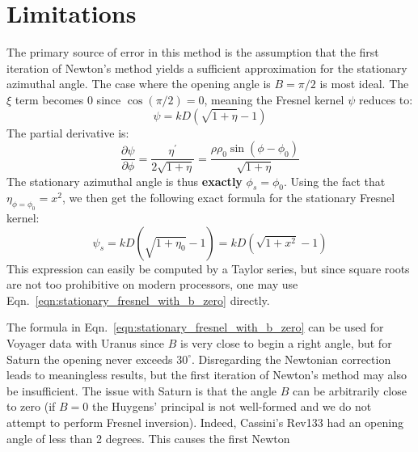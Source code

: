 \documentclass{article}
\theoremstyle{plain}
\begin{document}
    \section{Limitations}
        The primary source of error in this method is the assumption that
        the first iteration of Newton's method yields a sufficient
        approximation for the stationary azimuthal angle. The case where the
        opening angle is $B=\pi/2$ is most ideal.
        The $\xi$ term becomes $0$ since $\cos(\pi/2)=0$, meaning the
        Fresnel kernel $\psi$ reduces to:
        \begin{equation}
            \psi=kD\left(
                \sqrt{1+\eta}-1
            \right)
        \end{equation}
        The partial derivative is:
        \begin{equation}
            \frac{\partial\psi}{\partial\phi}
            =\frac{\eta^{\prime}}{2\sqrt{1+\eta}}
            =\frac{\rho\rho_{0}\sin(\phi-\phi_{0})}{\sqrt{1+\eta}}
        \end{equation}
        The stationary azimuthal angle is thus \textbf{exactly}
        $\phi_{s}=\phi_{0}$. Using the fact that $\eta_{\phi=\phi_{0}}=x^{2}$,
        we then get the following exact formula for the stationary Fresnel
        kernel:
        \begin{equation}
            \label{eqn:stationary_fresnel_with_b_zero}
            \psi_{s}
            =kD\left(
                \sqrt{1+\eta_{0}}-1
            \right)
            =kD(\sqrt{1+x^{2}}-1)
        \end{equation}
        This expression can easily be computed by a Taylor series, but since
        square roots are not too prohibitive on modern processors, one may
        use Eqn.~\ref{eqn:stationary_fresnel_with_b_zero} directly.
        \par\hfill\par
        The formula in Eqn.~\ref{eqn:stationary_fresnel_with_b_zero} can be
        used for Voyager data with Uranus since $B$ is very close to begin a
        right angle, but for Saturn the opening never exceeds $30^{\circ}$.
        Disregarding the Newtonian correction leads to meaningless results, but
        the first iteration of Newton's method may also be insufficient. The
        issue with Saturn is that the angle $B$ can be arbitrarily close to
        zero (if $B=0$ the Huygens' principal is not well-formed and we do not
        attempt to perform Fresnel inversion). Indeed, Cassini's Rev133 had an
        opening angle of less than 2 degrees. This causes the first Newton
\end{document}
